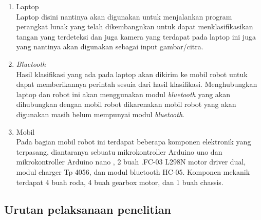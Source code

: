 \begin{enumerate}
  \item Laptop \\
  Laptop disini nantinya akan digunakan untuk menjalankan program perangkat lunak yang telah dikembangnkan untuk dapat menklasifikasikan tangan yang terdeteksi dan juga kamera yang terdapat pada laptop ini juga yang nantinya akan digunakan sebagai input gambar/citra.

  \item \textit{Bluetooth} \\
  Hasil klasifikasi yang ada pada laptop akan dikirim ke mobil robot untuk dapat memberikannya perintah sesuia dari hasil klasifikasi. Menghubungkan laptop dan robot ini akan menggunakan modul \textit{bluetooth} yang akan dihubungkan dengan mobil robot dikarenakan mobil robot yang akan digunakan masih belum mempunyai modul \textit{bluetooth}. 

  \item Mobil \\
  Pada bagian mobil robot ini terdapat beberapa komponen elektronik yang terpasang, diantaranya sebuatu mikrokontroller Arduino uno dan mikrokontroller Arduino nano , 2 buah .FC-03 L298N motor driver dual, modul charger Tp 4056, dan modul bluetooth HC-05. Komponen mekanik terdapat 4 buah roda, 4 buah gearbox motor, dan 1 buah chassis.
\end{enumerate}

\subsection{Urutan pelaksanaan penelitian}

